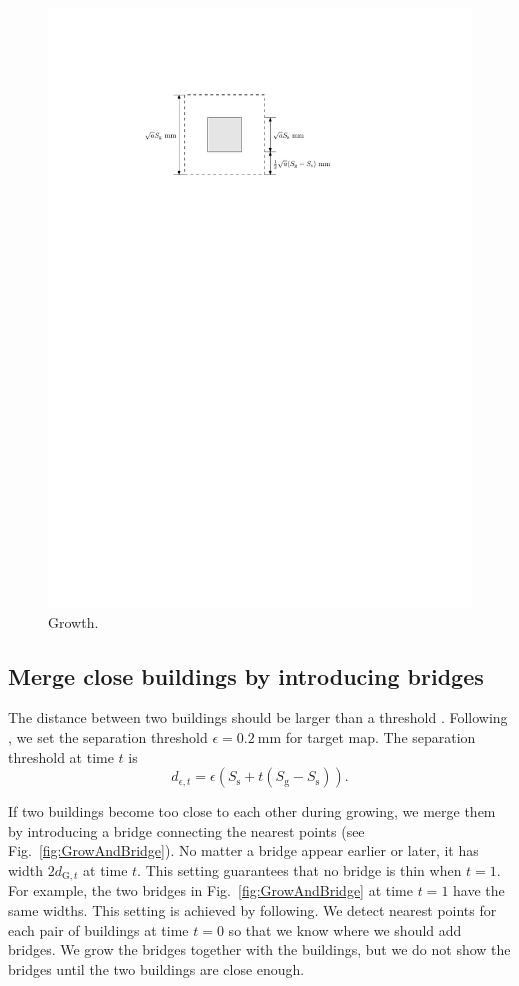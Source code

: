 \documentclass[graybox]{svmult}
\newcommand{\fig}{Fig.~}
\newcommand{\dtrm}[1]{d_{\mathrm{#1},t}}
\begin{document}
\begin{figure}[tb]
	\centering
	\includegraphics{Growth}
	\caption{Growth.}
	\label{fig:Growth}
\end{figure}


\subsection{Merge close buildings by introducing bridges}
The distance between two buildings should be larger than a threshold
\parencite{Regnauld2001,Li2004}.
Following \textcite{Basaraner2008,Stoter2009}, 
we set the separation threshold $\epsilon= 0.2~\text{mm}$ for target map. 
The separation threshold at time $t$ is
\[
d_{\epsilon, t} = \epsilon (S_\mathrm{s}+t(S_\mathrm{g}-S_\mathrm{s})).
\]

If two buildings become too close to each other during growing, 
we merge them by introducing a bridge connecting the nearest points 
(see \fig\ref{fig:GrowAndBridge}).
No matter a bridge appear earlier or later, 
it has width $2\dtrm{G}$ at time $t$.
This setting guarantees that no bridge is thin when $t=1$.
For example, the two bridges in \fig\ref{fig:GrowAndBridge} at time $t=1$ have 
the same widths.
This setting is achieved by following.
We detect nearest points for each pair of buildings at time $t=0$ so that 
we know where we should add bridges. 
We grow the bridges together with the buildings,
but we do not show the bridges until the two buildings are close enough. 
\end{document}
